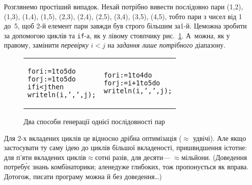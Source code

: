 {

\def\tabbb{\hspace*{1em}}

Розглянемо простіший випадок. Нехай потрібно вивести послідовно пари (1,2), (1,3), (1,4), (1,5), (2,3), (2,4), (2,5), (3,4), (3,5), (4,5), тобто пари з чисел від 1 до~5, щоб \mbox{2-й} елемент пари завжди був строго більшим за\nolinebreak[2] \mbox{1-й}. Це\nolinebreak[3] можна зробити за допомогою циклів та \texttt{if}-а, як у лівому стовпчику рис.~\ref{fig:check-or-gen-only-needed}. А~можна, як у правому, замінити \emph{перевірку} ${i{<}j}$ на \emph{задання лише потрібного} діапазону.

\begin{figure}[b]
\begin{center}
\hrulefill\par
\begin{tabular}{l|l}
\begin{minipage}{13em}\begin{small}\renewcommand{\baselinestretch}{0.875}\begin{alltt}for i:=1 to 5 do
\tabbb{}for j:=1 to 5 do
\tabbb\tabbb{}if i < j then
\tabbb\tabbb\tabbb{}writeln(i, ', ', j);\end{alltt}\end{small}\end{minipage}
&
\begin{minipage}{13em}\begin{small}\renewcommand{\baselinestretch}{0.875}\begin{alltt}for i:=1 to 4 do
\tabbb{}for j:=i+1 to 5 do
\tabbb\tabbb{}writeln(i, ', ', j);\end{alltt}\end{small}\end{minipage}
\end{tabular}
\end{center}
\caption{Два способи генерації однієї послідовності пар}\label{fig:check-or-gen-only-needed}
\end{figure}

}

Для \mbox{2-х} вкладених циклів це відносно дрібна оптимізація ($\approx$ удвічі). Але якщо застосувати ту саму ідею до циклів більшої вкладеності, пришвидшення істотне: для п'яти вкладених циклів\nolinebreak[3] $\approx$сотні разів, для десяти\nolinebreak[3] --- $\approx$мільйони. (Доведення потреб\'{у}є знань комбінаторики; але\nolinebreak[1] не\nolinebreak[3] дуже глибоких, тож пропонується як вправа. До\nolinebreak[3] того\nolinebreak[3] ж, писати програму можна й без доведення\dots)

